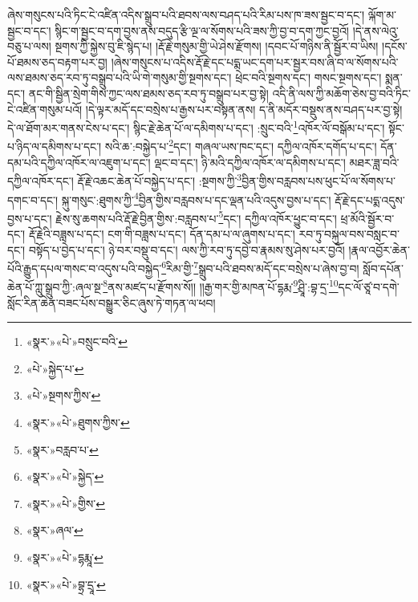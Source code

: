 ཞེས་གསུངས་པའི་ཏིང་ངེ་འཛིན་འདིས་སྒྲུབ་པའི་ཐབས་ལས་བཤད་པའི་རིམ་པས་ཁ་ཟས་སྦྱང་བ་དང་། ལྐོག་མ་སྦྱང་བ་དང་། སྙིང་ག་སྦྱང་བ་དག་བྱས་ནས་བདུད་རྩི་ལྔ་ལ་སོགས་པའི་ཟས་ཀྱི་བྱ་བ་དག་ཀྱང་བྱའོ། །དེ་ནས་ལེའུ་བཅུ་པ་ལས། སྔགས་ཀྱི་སྐྱེས་བུ་ཇི་སྙེད་པ། །རྡོ་རྗེ་གསུམ་གྱི་ཡེ་ཤེས་རྫོགས། །དབང་པོ་གཉིས་ནི་སྦྱོར་བ་ཡིས། །དངོས་པོ་ཐམས་ཅད་བརྟག་པར་བྱ། །ཞེས་གསུངས་པ་འདིས་རྡོ་རྗེ་དང་པདྨ་ཡང་དག་པར་སྦྱར་བས་ཞི་བ་ལ་སོགས་པའི་ལས་ཐམས་ཅད་རབ་ཏུ་བསྒྲུབ་པའི་ཡི་གེ་གསུམ་གྱི་སྔགས་དང་། ཕྲེང་བའི་སྔགས་དང་། གསང་སྔགས་དང་། སྨན་དང་། ནང་གི་སྦྱིན་སྲེག་གིས་ཀྱང་ལས་ཐམས་ཅད་རབ་ཏུ་བསྒྲུབ་པར་བྱ་སྟེ། འདི་ནི་ལས་ཀྱི་མཆོག་ཅེས་བྱ་བའི་ཏིང་ངེ་འཛིན་གསུམ་པའོ། །དེ་ལྟར་མདོ་དང་བསྲེས་པ་རྒྱས་པར་བསྟན་ནས། ད་ནི་མདོར་བསྡུས་ནས་བཤད་པར་བྱ་སྟེ། དེ་ལ་ཐོག་མར་གནས་ངེས་པ་དང་། སྙིང་རྗེ་ཆེན་པོ་ལ་དམིགས་པ་དང་། :སྲུང་བའི་\footnote{«སྣར་»«པེ་»བསྲུང་བའི་}འཁོར་ལོ་བསྒོམ་པ་དང་། སྟོང་པ་ཉིད་ལ་དམིགས་པ་དང་། སའི་ཆ་:བསྐྱེད་པ་\footnote{«པེ་»སྐྱེད་པ་}དང་། གཞལ་ཡས་ཁང་དང་། དཀྱིལ་འཁོར་དགོད་པ་དང་། དོན་དམ་པའི་དཀྱིལ་འཁོར་ལ་འཇུག་པ་དང་། ལྡང་བ་དང་། ཉི་མའི་དཀྱིལ་འཁོར་ལ་དམིགས་པ་དང་། མཐར་ཟླ་བའི་དཀྱིལ་འཁོར་དང་། རྡོ་རྗེ་འཆང་ཆེན་པོ་བསྐྱེད་པ་དང་། :སྔགས་ཀྱི་\footnote{«པེ་»སྔགས་ཀྱིས་}བྱིན་གྱིས་བརླབས་པས་ཕུང་པོ་ལ་སོགས་པ་དགང་བ་དང་། སྐུ་གསུང་:ཐུགས་ཀྱི་\footnote{«སྣར་»«པེ་»ཐུགས་ཀྱིས་}བྱིན་གྱིས་བརླབས་པ་དང་ལྡན་པའི་འདུས་བྱས་པ་དང་། རྡོ་རྗེ་དང་པདྨ་འདུས་བྱས་པ་དང་། རྗེས་སུ་ཆགས་པའི་རྡོ་རྗེ་བྱིན་གྱིས་:བརླབས་པ་\footnote{«སྣར་»བརླབ་པ་}དང་། དཀྱིལ་འཁོར་ཕྱུང་བ་དང་། ཕྲ་མོའི་སྦྱོར་བ་དང་། རྡོ་རྗེའི་བཟླས་པ་དང་། ངག་གི་བཟླས་པ་དང་། དོན་དམ་པ་ལ་ཞུགས་པ་དང་། རབ་ཏུ་བསྐུལ་བས་བསླང་བ་དང་། བསྟོད་པ་བྱེད་པ་དང་། ཉེ་བར་བསྡུ་བ་དང་། ལས་ཀྱི་རབ་ཏུ་དབྱེ་བ་རྣམས་སུ་ཤེས་པར་བྱའོ། །རྣལ་འབྱོར་ཆེན་པོའི་རྒྱུད་དཔལ་གསང་བ་འདུས་པའི་བསྐྱེད་\footnote{«སྣར་»«པེ་»སྐྱེད་}རིམ་གྱི་\footnote{«སྣར་»«པེ་»གྱིས་}སྒྲུབ་པའི་ཐབས་མདོ་དང་བསྲེས་པ་ཞེས་བྱ་བ། སློབ་དཔོན་ཆེན་པོ་ཀླུ་སྒྲུབ་ཀྱི་:ཞལ་སྔ་\footnote{«སྣར་»ཞལ་}ནས་མཛད་པ་རྫོགས་སོ།། །།རྒྱ་གར་གྱི་མཁན་པོ་དྷརྨ་\footnote{«སྣར་»«པེ་»དྷརྨཱ་}ཤྲཱི་:བྷ་དྲ་\footnote{«སྣར་»«པེ་»བྷྲ་དྲཱ་}དང་ལོ་ཙཱ་བ་དགེ་སློང་རིན་ཆེན་བཟང་པོས་བསྒྱུར་ཅིང་ཞུས་ཏེ་གཏན་ལ་ཕབ། 